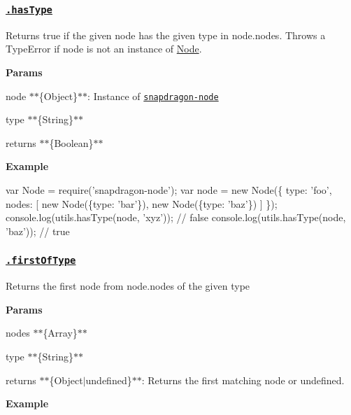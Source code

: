 \subsubsection*{\href{index.js#L486}{\tt .has\+Type}}

Returns true if the given {\ttfamily node} has the given {\ttfamily type} in {\ttfamily node.\+nodes}. Throws a {\ttfamily Type\+Error} if {\ttfamily node} is not an instance of {\ttfamily \mbox{\hyperlink{classNode}{Node}}}.

{\bfseries Params}


\begin{DoxyItemize}
\item {\ttfamily node} $\ast$$\ast$\{Object\}$\ast$$\ast$\+: Instance of \href{https://github.com/jonschlinkert/snapdragon-node}{\tt snapdragon-\/node}
\item {\ttfamily type} $\ast$$\ast$\{String\}$\ast$$\ast$
\item {\ttfamily returns} $\ast$$\ast$\{Boolean\}$\ast$$\ast$
\end{DoxyItemize}

{\bfseries Example}


\begin{DoxyCode}
var Node = require('snapdragon-node');
var node = new Node(\{
  type: 'foo',
  nodes: [
    new Node(\{type: 'bar'\}),
    new Node(\{type: 'baz'\})
  ]
\});
console.log(utils.hasType(node, 'xyz')); // false
console.log(utils.hasType(node, 'baz')); // true
\end{DoxyCode}


\subsubsection*{\href{index.js#L519}{\tt .first\+Of\+Type}}

Returns the first node from {\ttfamily node.\+nodes} of the given {\ttfamily type}

{\bfseries Params}


\begin{DoxyItemize}
\item {\ttfamily nodes} $\ast$$\ast$\{Array\}$\ast$$\ast$
\item {\ttfamily type} $\ast$$\ast$\{String\}$\ast$$\ast$
\item {\ttfamily returns} $\ast$$\ast$\{Object$\vert$undefined\}$\ast$$\ast$\+: Returns the first matching node or undefined.
\end{DoxyItemize}

{\bfseries Example}


